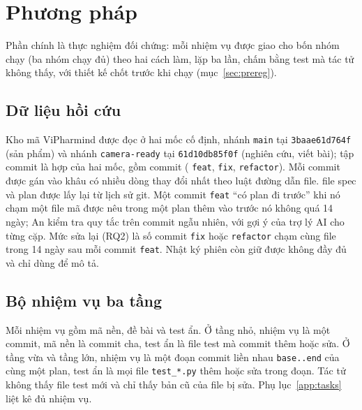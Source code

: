 \section{Phương pháp}\label{sec:method}

Phần chính là thực nghiệm đối chứng: mỗi nhiệm vụ được giao cho bốn nhóm chạy (ba nhóm chạy đủ) theo hai cách làm, lặp ba
lần, chấm bằng test mà tác tử không thấy, với thiết kế chốt trước khi chạy (mục~\ref{sec:prereg}).

\subsection{Dữ liệu hồi cứu}

Kho mã ViPharmind được đọc ở hai mốc cố định, nhánh \texttt{main} tại \texttt{3baae61d764f} (sản phẩm) và
nhánh \texttt{camera-ready} tại \texttt{61d10db85f0f} (nghiên cứu, viết bài); tập commit là hợp của hai
mốc, gồm \NumCommits{} commit (\NumCommitsFeat{} \texttt{feat}, \NumCommitsFix{} \texttt{fix},
\NumCommitsRefactor{} \texttt{refactor}). Mỗi commit được gán vào khâu có nhiều dòng thay đổi nhất theo
luật đường dẫn file. \NumSpecPlanFiles{} file spec và plan được lấy lại từ lịch sử git. Một commit
\texttt{feat} ``có plan đi trước'' khi nó chạm một file mã được nêu trong một plan thêm vào trước nó không
quá 14 ngày; An kiểm tra quy tắc trên \NumLinkChecked{} commit ngẫu nhiên, với gợi ý của trợ lý AI cho từng
cặp. Mức sửa lại (RQ2) là số commit \texttt{fix} hoặc \texttt{refactor} chạm cùng file trong 14 ngày sau mỗi
commit \texttt{feat}. Nhật ký phiên còn giữ được không đầy đủ và chỉ dùng để mô tả.

\subsection{Bộ nhiệm vụ ba tầng}\label{sec:tasks}

Mỗi nhiệm vụ gồm mã nền, đề bài và test ẩn. Ở tầng nhỏ, nhiệm vụ là một commit, mã nền là commit cha, test
ẩn là file test mà commit thêm hoặc sửa. Ở tầng vừa và tầng lớn, nhiệm vụ là một đoạn commit liền nhau
\texttt{base..end} của cùng một plan, test ẩn là mọi file \texttt{test\_*.py} thêm hoặc sửa trong đoạn. Tác
tử không thấy file test mới và chỉ thấy bản cũ của file bị sửa. Phụ lục~\ref{app:tasks} liệt kê đủ
\NumTasksMain{} nhiệm vụ.

